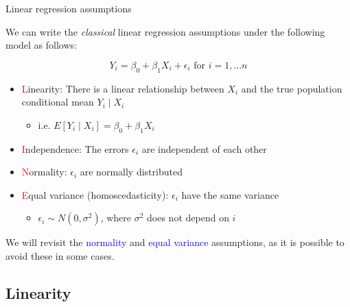 \documentclass[10pt,t]{beamer}
\begin{document}
\begin{frame}{Linear regression assumptions}
	\vspace{-5 mm}
	
	We can write the {\color{blue}\textit{classical}} linear regression assumptions under the following model as follows:
	
	$$
	Y_i = \beta_0 + \beta_1 X_i + \epsilon_i \text{ for } i = 1, \dots n
	$$
	
	\begin{itemize}
		\item \textcolor{red}{L}inearity: There is a linear relationship between $X_i$ and the true population conditional mean $Y_i \mid X_i$
		\smallskip
		\begin{itemize}
			\item i.e. $E[Y_i \mid X_i] = \beta_0 + \beta_1 X_i$
		\end{itemize}
		\medskip
		\item \textcolor{red}{I}ndependence: The errors $\epsilon_i$ are independent of each other
		\medskip
		\item \textcolor{red}{N}ormality: $\epsilon_i$ are normally distributed
		\medskip
		\item \textcolor{red}{E}qual variance (homoscedasticity): $\epsilon_i$ have the same variance
		\smallskip
		\begin{itemize}
			\item $\epsilon_i \sim N(0, \sigma^2)$, where $\sigma^2$ does not depend on $i$
		\end{itemize}
	\end{itemize}
	
	\vspace{0.3cm}
	
	We will revisit the \textcolor{blue}{normality} and \textcolor{blue}{equal variance} assumptions, as it is possible to avoid these in some cases.
\end{frame}


\subsection{Linearity}
\end{document}
